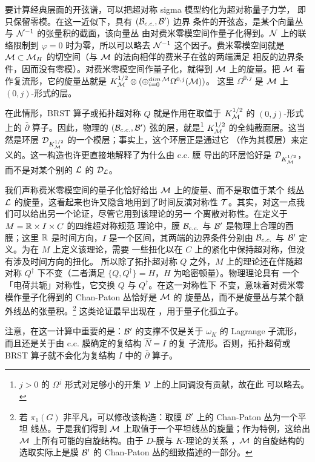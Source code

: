 要计算经典层面的开弦谱，可以把超对称 sigma 模型约化为超对称量子力学，
即只保留零模。在这一近似下，具有 $({\cal B}_{c.c.},{\cal B}')$ 边界
条件的开弦态，是某个向量丛与 ${\cal N}^{-1}$ 的张量积的截面，该向量丛
由对费米零模空间作量子化得到。${\cal N}$ 上的联络限制到 $\varphi=0$
时为零，所以可以略去 ${\cal N}^{-1}$ 这个因子。费米零模空间就是
$\M\subset \MH$ 的切空间（与 $\M$ 的法向相伴的费米子在弦的两端满足
相反的边界条件，因而没有零模）。对费米零模空间作量子化，就得到 $\M$
上的旋量。把 $\M$ 看作复流形，它的旋量丛就是
$K_\M^{1/2}\otimes(\oplus_{i=0}^{{\rm dim}\,\M}\Omega^{0,j}(\M))$。
这里 $\Omega^{0,j}$ 是 $\M$ 上 $(0,j)$-形式的层。

在此情形，BRST 算子或拓扑超对称 $Q$ 就是作用在取值于 $K_\M^{1/2}$ 的
$(0,j)$-形式上的 $\bar\partial$ 算子。因此，物理的
$({\cal B}_{c.c.},{\cal B}')$ 弦的层，就是\footnote{$j>0$ 的
$\Omega^j$ 形式对足够小的开集 ${{\cal V}}$ 上的上同调没有贡献，故在此
可以略去。} $K_\M^{1/2}$ 的全纯截面层。这当然是环层
${\cal D}_{K_{ \EUM}^{1/2}}$ 的一个模层；事实上，这个环层正是通过它
（作为其模层）来定义的。这一构造也许更直接地解释了为什么由 c.c. 膜
导出的环层恰好是 ${\cal D}_{K_{ \EUM}^{1/2}}$，而不是对某个别的
${\cal L}$ 的 ${\cal D}_{\cal L}$。

我们声称费米零模空间的量子化恰好给出 $\M$ 上的旋量、而不是取值于某个
线丛 ${\cal L}$ 的旋量，这看起来也许又隐含地用到了时间反演对称性
$\EUT$。其实，对这一点我们可以给出另一个论证，尽管它用到该理论的另一
个离散对称性。在定义于 $M=\Bbb{R}\times I\times C$ 的四维超对称规范
理论中，膜 ${\cal B}_{c.c.}$ 与 ${\cal B}'$ 是物理上合理的酉膜；这里
$\Bbb{R}$ 是时间方向，$I$ 是一个区间，其两端的边界条件分别由
${\cal B}_{c.c.}$ 与 ${\cal B}'$ 定义。为在 $M$ 上定义该理论，需要
一些扭化以在 $C$ 上的紧化中保持超对称，但没有涉及时间方向的扭化。
所以除了拓扑超对称 $Q$ 之外，$M$ 上的理论还在伴随超对称 $Q^\dagger$
下不变（二者满足 $\{Q,Q^\dagger\}=H$，$H$ 为哈密顿量）。物理理论具有
一个「电荷共轭」对称性，它交换 $Q$ 与 $Q^\dagger$。在这一对称性下
不变，意味着对费米零模作量子化得到的 Chan-Paton 丛恰好是 $\CM$ 的
旋量丛，而不是旋量丛与某个额外线丛的张量积。\footnote{若 $\pi_1(G)$
非平凡，可以修改该构造：取膜 ${\cal B}'$ 上的 Chan-Paton 丛为一个平坦
线丛。于是我们得到 $\M$ 上取值于一个平坦线丛的旋量；作为特例，这给出
$\M$ 上所有可能的自旋结构。由于 $D$-膜与 $K$-理论的关系
\cite{ref102}，$\M$ 的自旋结构的选取实际上是膜 ${\cal B}'$ 的
Chan-Paton 丛的细致描述的一部分。} 这类论证最早出现在
\cite{ref145}，用于量子化孤立子。

注意，在这一计算中重要的是：${\cal B}'$ 的支撑不仅是关于 $\omega_K$
的 Lagrange 子流形，而且还是关于由 c.c. 膜确定的复结构 $\hat N=I$ 的复
子流形。否则，拓扑超荷或 BRST 算子就不会化为复结构 $I$ 中的
$\bar\partial$ 算子。

